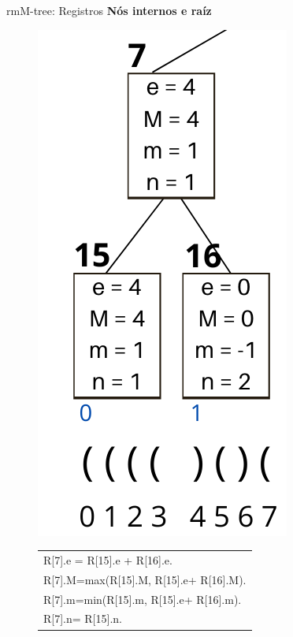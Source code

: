 \begin{frame}{rmM-tree: Registros}
    \textbf{Nós internos e raíz}
    \begin{figure}[h]
        \begin{minipage}[c]{0.35\linewidth}
            \includegraphics[scale=0.65]{images/internal-nodo.png}
        \end{minipage}
        \begin{minipage}[c]{0.49\linewidth}
            \begin{tabular}{l}\\
                R[7].e = R[15].e +  R[16].e.             \\
                R[7].M=max(R[15].M, R[15].e+ R[16].M).\\
                R[7].m=min(R[15].m, R[15].e+ R[16].m). \\
                R[7].n= R[15].n. \\
            \end{tabular}
        \end{minipage}
    \end{figure}
\end{frame}

